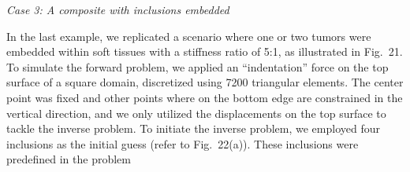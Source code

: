 \documentclass[11pt]{article}
\begin{document}
\noindent\textit{Case 3: A composite with inclusions embedded}

\vspace{0.5em}

\noindent
In the last example, we replicated a scenario where one or two
tumors were embedded within soft tissues with a stiffness ratio
of 5:1, as illustrated in Fig.~21. To simulate the forward problem,
we applied an ``indentation'' force on the top surface of a square
domain, discretized using 7200 triangular elements. The center
point was fixed and other points where on the bottom edge are
constrained in the vertical direction, and we only utilized the
displacements on the top surface to tackle the inverse problem.
To initiate the inverse problem, we employed four inclusions as
the initial guess (refer to Fig.~22(a)). These inclusions were
predefined in the problem

\end{document}
